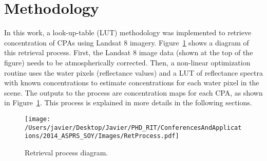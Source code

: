 \documentclass{article}
\begin{document}

\section{Methodology}
In this work, a look-up-table (LUT) methodology was implemented to retrieve concentration of CPAs using Landsat 8 imagery. Figure~\ref{fig:retrieval} shows a diagram of this retrieval process. First, the Landsat 8 image data (shown at the top of the figure) needs to be atmospherically corrected. Then, a non-linear optimization routine uses the water pixels (reflectance values) and a LUT of reflectance spectra with known concentrations to estimate concentrations for each water pixel in the scene. The outputs to the process are concentration maps for each CPA, as shown in Figure~\ref{fig:retrieval}. This process is explained in more details in the following sections.
\begin{figure}[!h]
    \texttt{[image: /Users/javier/Desktop/Javier/PHD\_RIT/ConferencesAndApplications/2014\_ASPRS\_SOY/Images/RetProcess.pdf]}
    \caption{Retrieval process diagram. \label{fig:retrieval} }
\end{figure}
\vspace{-.4cm}
\end{document}
